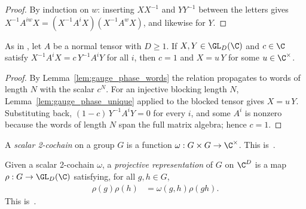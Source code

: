 \begin{proof}\leanok
    By induction on $w$: inserting $XX^{-1}$ and $YY^{-1}$ between the letters
    gives $X^{-1}A^{iw}X=(X^{-1}A^iX)(X^{-1}A^wX)$, and likewise for $Y$.
\end{proof}

\begin{lemma}\label{lem:gauge_phase_unique_normal}
    \leanok
    As in \cite[Section~III.A]{Cirac2021Matrix}, let $A$ be a normal tensor
    with $D\ge1$.  If $X,Y\in\GL_{D}(\C)$ and $c\in\C$ satisfy
    $X^{-1}A^iX=c\,Y^{-1}A^iY$ for all $i$, then $c=1$ and $X=u\,Y$ for some
    $u\in\C^{\times}$.
\end{lemma}

\begin{proof}\leanok
    By Lemma~\ref{lem:gauge_phase_words} the relation propagates to words of
    length $N$ with the scalar $c^N$.  For an
    injective blocking length $N$, Lemma~\ref{lem:gauge_phase_unique} applied to
    the blocked tensor gives $X=u\,Y$.  Substituting back,
    $(1-c)\,Y^{-1}A^iY=0$ for every $i$, and some $A^i$ is nonzero because the
    words of length $N$ span the full matrix algebra; hence $c=1$.
\end{proof}

\begin{definition}\label{def:scalar_cocycle}
    \leanok
    A \emph{scalar 2-cochain} on a group $G$ is a function
    $\omega : G \times G \to \C^{\times}$.
    This is~\cite[``Scalar 2-cochain'']{QICLean2026Blueprint}.
\end{definition}

\begin{definition}\label{def:projective_rep}
    \leanok
    Given a scalar 2-cochain $\omega$, a \emph{projective representation}
    of $G$ on $\C^D$ is a map $\rho : G \to \GL_{D}(\C)$ satisfying, for all
    $g,h \in G$,
    \begin{align}
        \rho(g) \rho(h)
         & =\omega(g,h) \rho(gh).
        \label{eq:symmetry_projective_law}
    \end{align}
    This is~\cite[``Projective representation'']{QICLean2026Blueprint}.
\end{definition}

